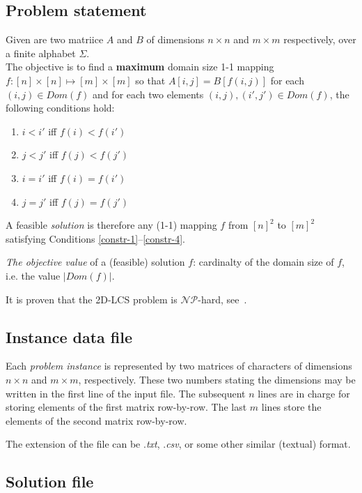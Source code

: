 \documentclass[]{article}
\begin{document}
\subsection{Problem statement}

Given are two matriice  $A$ and $B$ of dimensions $n\times n$ and $m \times m$ respectively, over a finite alphabet $\Sigma$.  \\
The objective is to find a \textbf{maximum} domain size 1-1 mapping $f \colon [n] \times [n] \mapsto [m] \times [m] $ so that $A[i, j] = B[f(i, j)]$ for each $(i, j) \in Dom(f)$ and
for each two elements $(i, j), (i',j') \in Dom(f)$, the following conditions hold:
\begin{enumerate}  
	\item $i < i'$ iff $f(i) < f(i')$  \label{constr-1}
	\item $j < j'$ iff $f(j) < f(j')$
	\item $i = i'$ iff $f(i) = f(i')$
    \item $j = j'$ iff $f(j) = f(j')$	\label{constr-4}
\end{enumerate}


A feasible \textit{solution} is therefore any (1-1) mapping $f$ from $[n]^2$ to $[m]^2$ satisfying Conditions \ref{constr-1}--\ref{constr-4}. 

\textit{The objective value} of a (feasible) solution $f$:  cardinalty of the domain size of $f$, i.e. the value $|Dom(f)|$. 

It is proven that the 2D-LCS problem is $\mathcal{NP}$-hard, see~\cite{2d_lcs_amir}. 

  

\subsection{Instance data file}


Each \textit{problem instance} is represented by two matrices of characters of dimensions $n \times n$ and $m \times m$, respectively. These two numbers stating the dimensions may be written in the first line of the input file.  The subsequent $n$ lines are in charge for storing  elements of the first matrix row-by-row. The last $m$ lines store the elements of the second matrix row-by-row.

The extension of the file can be .\textit{txt}, .\textit{csv}, or some other similar (textual) format.

\subsection{Solution file}
\end{document}
